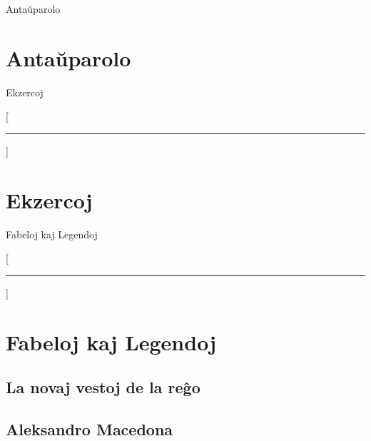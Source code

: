 \documentclass[a5paper,11pt,openany,twoside]{book}
\begin{document}
\newpage

%
%
\zamenhof

%
%



 Antaŭparolo

\chapter*{Anta\u uparolo}
\thispagestyle{empty}
\fancyhead[LE,RO]{\footnotesize\thepage}
\fancyhead[CE]{\footnotesize\leftmark}
\fancyhead[CO]{\footnotesize\rightmark}
\label{antau}



 Ekzercoj

\mainmatter
{}[{\rule{13mm}{0.4pt}}]
\chapter{Ekzercoj}
\label{ekzercoj}



 Fabeloj kaj Legendoj

\titleformat{\chapter}[display]{\filcenter\Large}{\thechapter}{1ex}{\MakeUppercase}[{\rule{13mm}{0.4pt}}]
\chapter{Fabeloj kaj Legendoj}
\section{La novaj vestoj de la re\^go}
\label{novajvestoj}


\section{Aleksandro Macedona}
\label{aleksandro}

\end{document}
